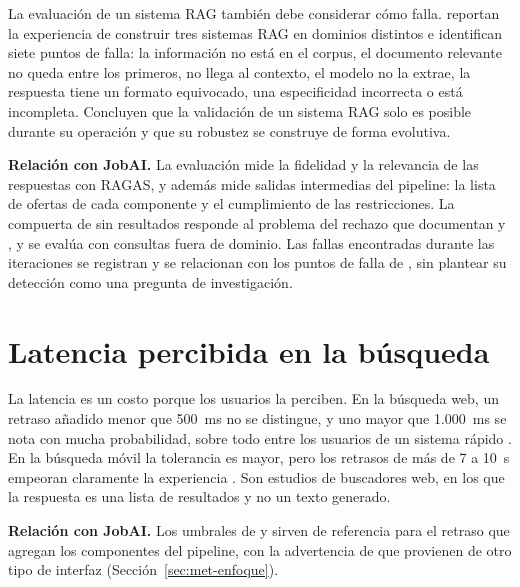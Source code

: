 La evaluación de un sistema RAG también debe considerar cómo falla. \citet{Barnett2024} reportan la experiencia de construir tres sistemas RAG en dominios distintos e identifican siete puntos de falla: la información no está en el corpus, el documento relevante no queda entre los primeros, no llega al contexto, el modelo no la extrae, la respuesta tiene un formato equivocado, una especificidad incorrecta o está incompleta. Concluyen que la validación de un sistema RAG solo es posible durante su operación y que su robustez se construye de forma evolutiva.

\textbf{Relación con JobAI.} La evaluación mide la fidelidad y la relevancia de las respuestas con RAGAS, y además mide salidas intermedias del pipeline: la lista de ofertas de cada componente y el cumplimiento de las restricciones. La compuerta de sin resultados responde al problema del rechazo que documentan \citet{Chen2024RGB} y \citet{Peng2025}, y se evalúa con consultas fuera de dominio. Las fallas encontradas durante las iteraciones se registran y se relacionan con los puntos de falla de \citet{Barnett2024}, sin plantear su detección como una pregunta de investigación.

\section{Latencia percibida en la búsqueda}
\label{sec:estado-arte-latencia}

La latencia es un costo porque los usuarios la perciben. En la búsqueda web, un retraso añadido menor que 500~ms no se distingue, y uno mayor que 1.000~ms se nota con mucha probabilidad, sobre todo entre los usuarios de un sistema rápido \citep{Arapakis2014,Bai2017}. En la búsqueda móvil la tolerancia es mayor, pero los retrasos de más de 7 a 10~s empeoran claramente la experiencia \citep{Arapakis2021}. Son estudios de buscadores web, en los que la respuesta es una lista de resultados y no un texto generado.

\textbf{Relación con JobAI.} Los umbrales de \citet{Arapakis2014} y \citet{Bai2017} sirven de referencia para el retraso que agregan los componentes del pipeline, con la advertencia de que provienen de otro tipo de interfaz (Sección~\ref{sec:met-enfoque}).
